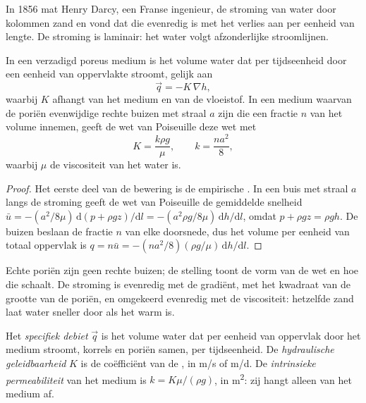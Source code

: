In 1856 mat Henry Darcy, een Franse ingenieur, de stroming van water door
kolommen zand en vond dat die evenredig is met het verlies aan  per
eenheid van lengte. De stroming is laminair: het water volgt afzonderlijke stroomlijnen.

\begin{theorem}\label{thm:b3:hydrogeology:darcy}
In een verzadigd poreus medium is het volume water dat per
tijdseenheid door een eenheid van oppervlakte stroomt, gelijk aan
\[
\vec q = -K\,\nabla h ,
\]
waarbij $K$ afhangt van het medium en van de vloeistof. In een medium waarvan de poriën
evenwijdige rechte buizen met straal $a$ zijn die een fractie $n$ van het
volume innemen, geeft de wet van Poiseuille deze wet met
\[
K = \frac{k\rho g}{\mu}, \qquad k = \frac{na^2}{8} ,
\]
waarbij $\mu$ de viscositeit van het water is.
\end{theorem}

\begin{proof}
Het eerste deel van de bewering is de empirische . In een buis met straal $a$
langs de stroming geeft de wet van Poiseuille de gemiddelde snelheid $\bar u =
-(a^2/8\mu)\,\mathrm d(p + \rho gz)/\mathrm dl = -(a^2\rho g/8\mu)\,\mathrm
dh/\mathrm dl$, omdat $p + \rho gz = \rho g h$. De buizen beslaan de
fractie $n$ van elke doorsnede, dus het volume per eenheid van totaal oppervlak is
$q = n\bar u = -(na^2/8)(\rho g/\mu)\,\mathrm dh/\mathrm dl$.
\end{proof}

Echte poriën zijn geen rechte buizen; de stelling toont de vorm van de wet
en hoe die schaalt. De stroming is evenredig met de gradiënt, met het kwadraat
van de grootte van de poriën, en omgekeerd evenredig met de viscositeit: hetzelfde zand
laat water sneller door als het warm is.

\begin{definition}\label{def:b3:hydrogeology:darcy}
Het \emph{specifiek debiet} $\vec q$ is het
volume water dat per eenheid van oppervlak door het medium stroomt, korrels en poriën
samen, per tijdseenheid. De \emph{hydraulische
geleidbaarheid} $K$ is de coëfficiënt
van de , in \unit{m/s} of \unit{m/d}. De \emph{intrinsieke
permeabiliteit} van het medium is $k =
K\mu/(\rho g)$, in \unit{m^2}: zij hangt alleen van het medium af.
\end{definition}

